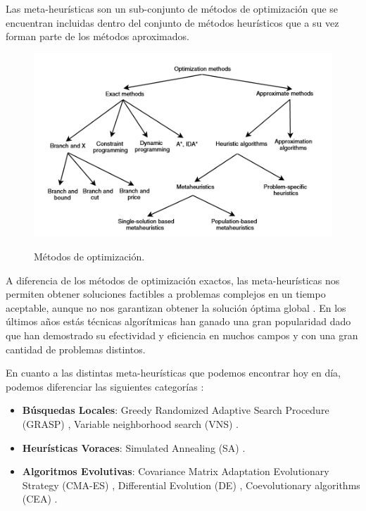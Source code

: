 Las meta-heurísticas son un sub-conjunto de métodos de optimización que se encuentran incluidas dentro del conjunto de métodos heurísticos que a su vez forman parte de los métodos aproximados.

\begin{figure}
  \centering
\includegraphics[scale=1.0]{images/meta}\\[10mm]
  \caption{Métodos de optimización.}
\end{figure}

A diferencia de los métodos de optimización exactos, las meta-heurísticas nos permiten obtener soluciones factibles a problemas complejos en un tiempo aceptable, aunque no nos garantizan obtener la solución óptima global \cite{metaheuristics}. En los últimos años estás técnicas algorítmicas han ganado una gran popularidad dado que han demostrado su efectividad y eficiencia en muchos campos y con una gran cantidad de problemas distintos.

En cuanto a las distintas meta-heurísticas que podemos encontrar hoy en día, podemos diferenciar las siguientes categorías \cite{metaheuristics}:

\begin{itemize}
    \item \textbf{Búsquedas Locales}: Greedy Randomized Adaptive Search Procedure (GRASP) \cite{GRASP}, Variable neighborhood search (VNS) \cite{vns}.
    \item \textbf{Heurísticas Voraces}: Simulated Annealing (SA) \cite{SA}.
    \item \textbf{Algoritmos Evolutivas}: Covariance Matrix Adaptation Evolutionary Strategy (CMA-ES) \cite{CMA}, Differential Evolution (DE) \cite{DE1, DE2, DE3}, Coevolutionary algorithms (CEA) \cite{COE1, COE2, COE3}.
\end{itemize}



